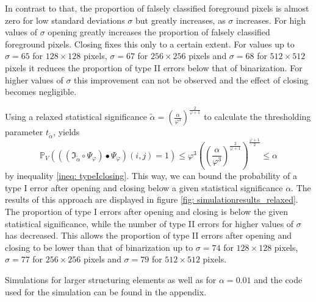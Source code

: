 \documentclass[a4paper,12pt]{article}
\theoremstyle{plain}
\theoremstyle{definition}
\begin{document}
In contrast to that, the proportion of falsely classified foreground pixels is almost zero for low standard deviations $\sigma$ but greatly increases, as $\sigma$ increases. For high values of $\sigma$ opening greatly increases the proportion of falsely classified foreground pixels. Closing fixes this only to a certain extent. For values up to $\sigma = 65$ for $128 \times 128$ pixels, $\sigma = 67$ for $256 \times 256$ pixels and $\sigma = 68$ for $512 \times 512$ pixels it reduces the proportion of type II errors below that of binarization. For higher values of $\sigma$ this improvement can not be observed and the effect of closing becomes negligible.

Using a relaxed statistical significance $\tilde{\alpha} = \left( \frac{\alpha}{\varphi^3} \right)^{\frac{2}{\varphi + 1}}$ to calculate the thresholding parameter $t_{\tilde{\alpha}}$, yields
\begin{equation*}
	\mathbb{P}_V\left( ((\mathfrak{I}_{\tilde{\alpha}} \circ \Psi_\varphi) \bullet \Psi_\varphi)(i, j) = 1 \right) \leq \varphi^3 \left( \left( \frac{\alpha}{\varphi^3} \right)^{\frac{2}{\varphi + 1}} \right)^{\frac{\varphi + 1}{2}} \leq \alpha
\end{equation*}
by inequality \eqref{ineq: typeIclosing}. This way, we can bound the probability of a type I error after opening and closing below a given statistical significance $\alpha$. The results of this approach are displayed in figure \ref{fig: simulationresults_relaxed}. The proportion of type I errors after opening and closing is below the given statistical significance, while the number of type II errors for higher values of $\sigma$ has decreased. This allows the proportion of type II errors after opening and closing to be lower than that of binarization up to $\sigma = 74$ for $128 \times 128$ pixels, $\sigma = 77$ for $256 \times 256$ pixels and $\sigma = 79$ for $512 \times 512$ pixels.

Simulations for larger structuring elements as well as for $\alpha = 0.01$ and the code used for the simulation can be found in the appendix.
\end{document}
